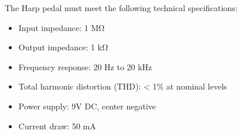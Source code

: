 The Harp pedal must meet the following technical specifications:
\begin{itemize}
\item Input impedance: 1 MΩ
\item Output impedance: 1 kΩ
\item Frequency response: 20 Hz to 20 kHz
\item Total harmonic distortion (THD): < 1\% at nominal levels
\item Power supply: 9V DC, center negative
\item Current draw: 50 mA
\end{itemize}
